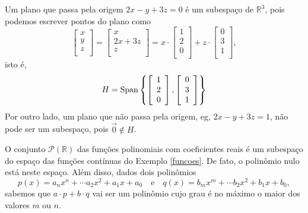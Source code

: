 \documentclass[../livro.tex]{subfiles}  %
\begin{document}
\begin{example}
	Um plano que passa pela origem $2x - y + 3z = 0$ é um subespaço de $\mathbb{R}^3$, pois podemos escrever pontos do plano como
	\begin{equation}
	\left[
	\begin{array}{c}
	x \\
	y \\
	z \\
	\end{array}
	\right] =
	\left[
	\begin{array}{c}
	x \\
	2x +3z \\
	z \\
	\end{array}
	\right] = x \cdot
	\left[
	\begin{array}{c}
	1 \\
	2 \\
	0 \\
	\end{array}
	\right] + z \cdot
	\left[
	\begin{array}{c}
	0 \\
	3 \\
	1 \\
	\end{array}
	\right],
	\end{equation} isto é,
	\begin{equation}
	H = \operatorname{Span} \left\{
	\left[
	\begin{array}{c}
	1 \\
	2 \\
	0 \\
	\end{array}
	\right],
	\left[
	\begin{array}{c}
	0 \\
	3 \\
	1 \\
	\end{array}
	\right]
	\right\}
	\end{equation} Por outro lado, um plano que não passa pela origem, eg, $2x - y + 3z = 1$, não pode ser um subespaço, pois $\vec{0} \not\in H$.
\end{example}



\begin{example}
	O conjunto $\mathcal{P} (\mathbb{R})$ das funções polinomiais com coeficientes reais é um subespaço do espaço das funções contínuas do Exemplo \ref{funcoes}. De fato, o polinômio nulo está neste espaço. Além disso, dados dois polinômios
	\begin{equation}
	p(x) = a_n x^n + \cdots a_2 x^2 + a_1 x + a_0 \quad \text{e} \quad q(x) = b_m x^m + \cdots b_2 x^2 + b_1 x + b_0,
	\end{equation} sabemos que $a \cdot p + b \cdot q$ vai ser um polinômio cujo grau é no máximo o maior dos valores $m$ ou $n$.
\end{example}
\end{document}
